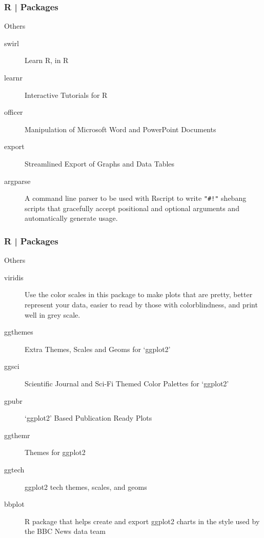 \begin{frame}[fragile]
  \frametitle{R | Packages}
  \begin{block}{Others}
    \begin{description}
      \item[\alert{swirl}] Learn R, in R
      \item[learnr] Interactive Tutorials for R
      \item[officer] Manipulation of Microsoft Word and PowerPoint Documents
      \item[export] Streamlined Export of Graphs and Data Tables
      \item[\alert{argparse}] A command line parser to be used with Rscript to write \verb|"#!"| shebang scripts that gracefully accept positional and optional \alert{arguments} and automatically generate usage.
    \end{description}
  \end{block}
\end{frame}

\begin{frame}[fragile]
  \frametitle{R | Packages}
  \begin{block}{Others}
    \begin{description}
      \item[viridis] Use the color scales in this package to make plots that are pretty, better represent your data, easier to read by those with colorblindness, and print well in grey scale. 
      \item[ggthemes] Extra Themes, Scales and Geoms for `ggplot2'
      \item[\alert{ggsci}] Scientific Journal and Sci-Fi Themed Color Palettes for `ggplot2'
      \item[\alert{gpubr}] `ggplot2' Based Publication Ready Plots
      \item[ggthemr] Themes for ggplot2
      \item[ggtech] ggplot2 tech themes, scales, and geoms
      \item[bbplot] R package that helps create and export ggplot2 charts in the style used by the BBC News data team
    \end{description}
  \end{block}
\end{frame}

